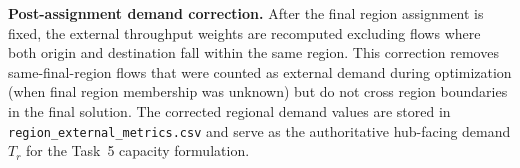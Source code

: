 \textbf{Post-assignment demand correction.} After the final region assignment is fixed, the
external throughput weights are recomputed excluding flows where both origin and destination
fall within the same region. This correction removes same-final-region flows that were
counted as external demand during optimization (when final region membership was unknown) but
do not cross region boundaries in the final solution. The corrected regional demand values
are stored in \texttt{region\_external\_metrics.csv} and serve as the authoritative
hub-facing demand $T_r$ for the Task~5 capacity formulation.
